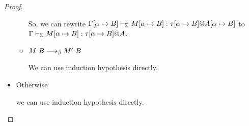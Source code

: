 \begin{proof}
\begin{itemize}
\begin{itemize}
		      	      So, we can rewrite $\Gamma[\alpha \mapsto B] \vdash_\Sigma M[\alpha \mapsto B] : \tau[\alpha \mapsto B] @ A[\alpha \mapsto B]$ to
		      	      $\Gamma \vdash_\Sigma M[\alpha \mapsto B] : \tau[\alpha \mapsto B] @ A$.
		      	\item $M\ B \longrightarrow_{\beta} M'\ B$
		      	      		      	      	      	      	      	      	      	      	      	      	      	      	      	      	      	      	      	      		      	      	      	      	      	      	      	      
		      	      We can use induction hypothesis directly.
		      \end{itemize}
		      		      	      	      	      	      	      	      	      	      		      	      	      	      
		\item Otherwise
		      		      	      	      	      	      	      	      	      	      		      	      	      	      
		      we can use induction hypothesis directly.
	\end{itemize}
\end{proof}
	
